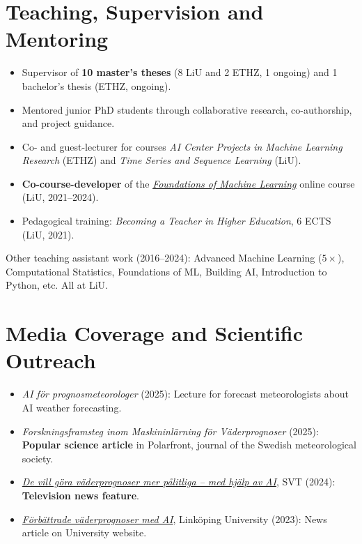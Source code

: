 \documentclass[11pt]{article}
\begin{document}
\section*{Teaching, Supervision and Mentoring}
\begin{itemize}
    \item Supervisor of \textbf{10 master's theses} (8 LiU and 2 ETHZ, 1 ongoing) and 1 bachelor's thesis (ETHZ, ongoing).
    \item Mentored junior PhD students through collaborative research, co-authorship, and project guidance.
    \item Co- and guest-lecturer for courses \textit{AI Center Projects in Machine Learning Research} (ETHZ) and \textit{Time Series and Sequence Learning} (LiU).
    \item \textbf{Co-course-developer} of the \href{https://foundations-of-ml.ida.liu.se/}{\textit{Foundations of Machine Learning}} online course (LiU, 2021--2024).
    \item Pedagogical training: \textit{Becoming a Teacher in Higher Education}, 6 ECTS (LiU, 2021).
\end{itemize}
{\footnotesize
Other teaching assistant work (2016--2024): Advanced Machine Learning ($5\times$), Computational Statistics, Foundations of ML, Building AI, Introduction to Python, etc. All at LiU.
}
\section*{Media Coverage and Scientific Outreach}
\begin{itemize}
    \item \textit{AI för prognosmeteorologer} (2025): Lecture for forecast meteorologists about AI weather forecasting.
    \item \textit{Forskningsframsteg inom Maskininlärning för Väderprognoser} (2025): \textbf{Popular science article} in Polarfront, journal of the Swedish meteorological society.
    \item \href{https://www.svt.se/nyheter/lokalt/ost/de-vill-gora-vaderprognoser-mer-palitliga-med-hjalp-av-ai}{\textit{De vill göra väderprognoser mer pålitliga -- med hjälp av AI}}, SVT (2024): \textbf{Television news feature}.
    \item \href{https://liu.se/artikel/forbattrade-vaderprognoser-med-ai}{\textit{Förbättrade väderprognoser med AI}}, Linköping University (2023): News article on University website.
\end{itemize}
\end{document}
